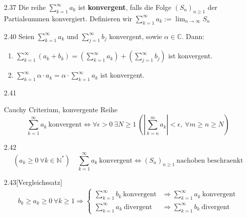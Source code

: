 \documentclass[8pt,a4paper,twocolumn,table]{extarticle}
\newcommand{\N}{\mathbb{N}}
\newcommand{\seq}[1]{\left( #1_n \right)_{n \ge 1}}
\begin{document}
\begin{definition}{2.37}
    Die reihe $\sum_{k = 1}^{\infty} a_k$ ist \textbf{konvergent}, falls die Folge $\seq{S}$ der Partialsummen konvergiert.
    Definieren wir $\sum_{k = 1}^{\infty} a_k := \lim_{n \to \infty} S_n$
\end{definition}

\begin{satz}{2.40}
    Seien $\sum_{k=1}^{\infty} a_k$ und $\sum_{j=1}^{\infty} b_j$ konvergent, sowie $\alpha \in \mathbb{C}$.
    Dann:
    \begin{enumerate}
        \item $\sum_{k=1}^{\infty} (a_k + b_k) = \left( \sum_{k=1}^{\infty} a_k \right) + \left( \sum_{j=1}^{\infty} b_j \right)$ ist konvergent.
        \item $\sum_{k=1}^{\infty} \alpha \cdot a_k = \alpha \cdot \sum_{k=1}^{\infty} a_k$ ist konvergent.
    \end{enumerate}
\end{satz}

\begin{satz}{2.41}
    \label{satz:cauchy-criterium-reihe}
    \par Cauchy Criterium, konvergente Reihe
    \[
        \sum_{k=1}^\infty a_k\ \mbox{konvergent}
        \Leftrightarrow
        \forall \epsilon > 0\ \exists N \ge 1\ \left( \left| \sum_{k=n}^m a_k \right| < \epsilon,\ \forall m \ge n \ge N \right)
    \]
\end{satz}

\begin{satz}{2.42}
    \[
        (a_k \ge 0\ \forall k \in \N^*)
        \quad
        \sum_{k=1}^\infty a_k\ \mbox{konvergent}
        \Leftrightarrow
        \seq{S}\ \mbox{nachoben beschraenkt}
    \]
\end{satz}

\begin{korollar}{2.43}[Vergleichssatz]
    \begin{align*}
        b_k \ge a_k \ge 0\ \forall k \ge 1
        \Rightarrow \begin{cases}
            \sum_{k=1}^\infty b_k\ \mbox{konvergent} & \Rightarrow \sum_{k=1}^\infty a_k\ \mbox{konvergent} \\
            \sum_{k=1}^\infty a_k\ \mbox{divergent}  & \Rightarrow \sum_{k=1}^\infty b_k\ \mbox{divergent}
        \end{cases}
    \end{align*}
\end{korollar}
\end{document}
